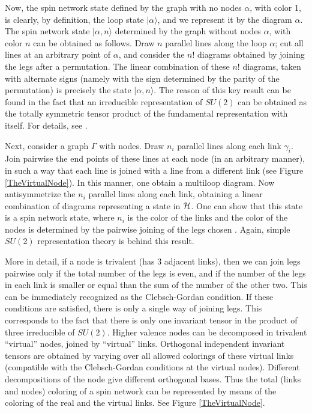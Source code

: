 Now, the spin network state defined by the graph with no nodes 
$\alpha$, with color 1, is clearly, by definition, the loop state 
$|\alpha\rangle$, and we represent it by the diagram $\alpha$.  
The spin network state $|\alpha, n\rangle$ determined by the graph 
without nodes $\alpha$, with color $n$ can be obtained as 
follows.  Draw $n$ parallel lines along the loop $\alpha$; cut 
all lines at an arbitrary point of $\alpha$, and consider the 
$n!$ diagrams obtained by joining the legs after a permutation.  
The linear combination of these $n!$ diagrams, taken with 
alternate signs (namely with the sign determined by the parity of 
the permutation) is precisely the state $|\alpha, n\rangle$.  The 
reason of this key result can be found in the fact that an  
irreducible representation of $SU(2)$ can be obtained as the 
totally symmetric tensor product of the fundamental 
representation with itself.  For details, see 
\cite{DePietriRovelli}.

Next, consider a graph $\Gamma$ with nodes.  Draw $n_{i}$ parallel 
lines along each link $\gamma_{i}$.  Join pairwise the end points 
of these lines at each node (in an arbitrary manner), in such a 
way that each line is joined with a line from a different link 
(see Figure \ref{TheVirtualNode}).  In this manner, one obtain a 
multiloop diagram.  Now antisymmetrize the $n_{i}$ parallel lines 
along each link, obtaining a linear combination of diagrams 
representing a state in $\cal H$.  One can show that this state is 
a spin network state, where $n_{i}$ is the color of the links and 
the color of the nodes is determined by the pairwise joining of 
the legs chosen \cite{DePietriRovelli}.  Again, simple $SU(2)$ 
representation theory is behind this result.

More in detail, if a node is trivalent (has 3 adjacent links), 
then we can join legs pairwise only if the total number of the legs 
is even, and if the number of the legs in each link is smaller 
or equal than the sum of the number of the other two. This can 
be immediately recognized as the Clebsch-Gordan condition. If 
these conditions are satisfied, there is only a single way of 
joining legs. This corresponds to the fact that there is only one 
invariant tensor in the product of three irreducible of $SU(2)$. 
Higher valence nodes can be decomposed in trivalent ``virtual'' 
nodes, joined by ``virtual'' links.  Orthogonal independent 
invariant tensors are obtained by varying over all allowed 
colorings of these virtual links (compatible with the 
Clebsch-Gordan conditions at the virtual nodes). Different 
decompositions of the node give different orthogonal bases. 
Thus the total (links and nodes) coloring of a spin network can 
be represented by means of the coloring of the real and the 
virtual links. See Figure \ref{TheVirtualNode}. 

